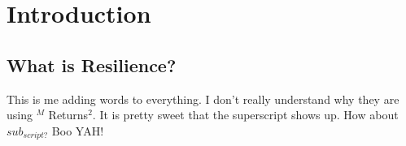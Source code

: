 
\renewcommand{\thechapter}{1}

\chapter{Introduction}

\section{What is Resilience?}

This is me adding words to everything. I don't really understand
why they are using $^{M}$ Returns$^2$. It is pretty sweet that the
superscript shows up. How about $sub_{script?}$ \cite{Ayyub2014} Boo YAH!

